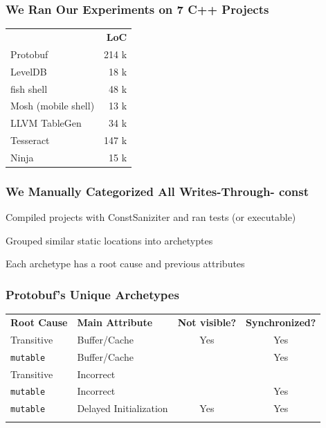 \documentclass[aspectratio=169]{beamer}
\newcommand{\const}{{\color{blue} \bfseries \ttfamily const}}
\begin{document}
  \begin{frame}
    \frametitle{We Ran Our Experiments on 7 C++ Projects}
    \Large
    \centering
    \begin{tabular}{l r}
      & \textbf{LoC} \\

      Protobuf & 214 k\\
      LevelDB & 18 k \\
      fish shell & 48 k \\
      Mosh (mobile shell) & 13 k \\
      LLVM TableGen & 34 k \\
      Tesseract & 147 k \\
      Ninja & 15 k \\
    \end{tabular}
  \end{frame}

  \begin{frame}
    \frametitle{We Manually Categorized All Writes-Through-\const{}}
    \Large
    Compiled projects with ConstSaniziter and ran tests (or executable)

    \vspace{1em}
    Grouped similar static locations into archetyptes

    \vspace{1em}
    Each archetype has a root cause and previous attributes
  \end{frame}

  \begin{frame}
    \frametitle{Protobuf's Unique Archetypes}
    \Large
    \begin{tabular}{p{2.65cm} p{4cm} c c}
      \textbf{Root Cause} & \textbf{Main Attribute}
      & \textbf{Not visible?} & \textbf{Synchronized?} \\

      Transitive & Buffer/Cache & Yes & Yes \\
      \texttt{mutable} & Buffer/Cache &   & Yes \\
      Transitive & Incorrect &   &   \\
      \texttt{mutable} & Incorrect &   & Yes \\
      \texttt{mutable} & Delayed Initialization & Yes & Yes \\
      & & & \\
    \end{tabular}
  \end{frame}
\end{document}
